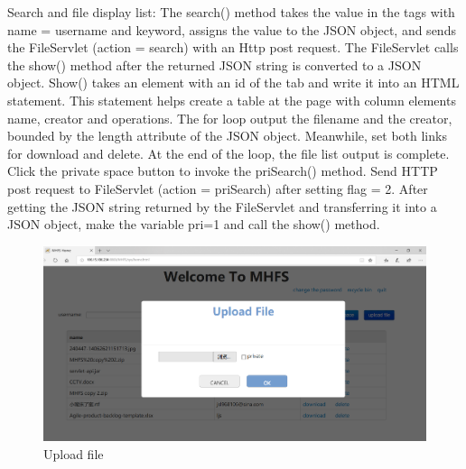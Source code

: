 \documentclass[a4paper,11pt]{article}
\begin{document}
\begin{itemize}
\par Search and file display list: The search() method takes the value in the tags with name = username and keyword, assigns the value to the JSON object, and sends the FileServlet (action = search) with an Http post request. The FileServlet calls the show() method after the returned JSON string is converted to a JSON object. Show() takes an element with an id of the tab and write it into an HTML statement. This statement helps create a table at the page with column elements name, creator and operations. The for loop output the filename and the creator, bounded by the length attribute of the JSON object. Meanwhile, set both links for download and delete. At the end of the loop, the file list output is complete. Click the private space button to invoke the priSearch() method. Send HTTP post request to FileServlet (action = priSearch) after setting flag = 2. After getting the JSON string returned by the FileServlet and transferring it into a JSON object, make the variable pri=1 and call the show() method.

\begin{figure}[ht]
    \centering
    \includegraphics[scale=0.3]{4p.png}
    \caption{Upload file}
    \label{fig:Upload file}
\end{figure}


\end{itemize}
\end{document}
